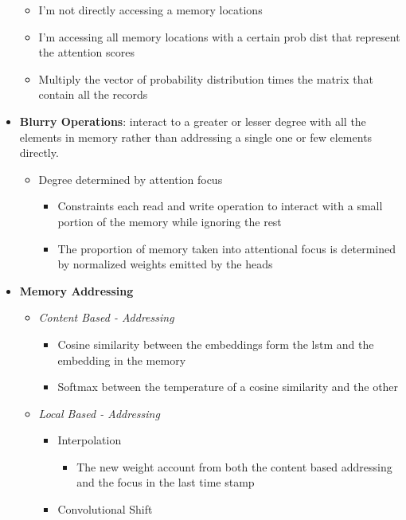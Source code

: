 \begin{itemize}
\begin{itemize}
        \item I'm not directly accessing a memory locations
        \item I'm accessing all memory locations with a certain prob dist that represent the attention scores
        \item Multiply the vector of probability distribution times the matrix that contain all the records
    \end{itemize}
    \item \textbf{Blurry Operations}: interact to a greater or lesser degree with all the elements in memory rather than addressing a single one or few elements directly.
    \begin{itemize}
        \item Degree determined by attention focus 
        \begin{itemize}
            \item Constraints each read and write operation to interact with a small portion of the memory while ignoring the rest
            \item The proportion of memory taken into attentional focus is determined by normalized weights emitted by the heads
        \end{itemize}
    \end{itemize}
    \item \textbf{Memory Addressing}
    \begin{itemize}
        \item \textit{Content Based - Addressing}
        \begin{itemize}
            \item Cosine similarity between the embeddings form the lstm and the embedding in the memory
            \item Softmax between the temperature of a cosine similarity and the other
        \end{itemize}
        \item \textit{Local Based  - Addressing}
        \begin{itemize}
            \item Interpolation
            \begin{itemize}
                \item The new weight account from both the content based addressing and the focus in the last time stamp
            \end{itemize}
            \item Convolutional Shift
            \begin{itemize}

\end{itemize}
\end{itemize}
\end{itemize}
\end{itemize}
